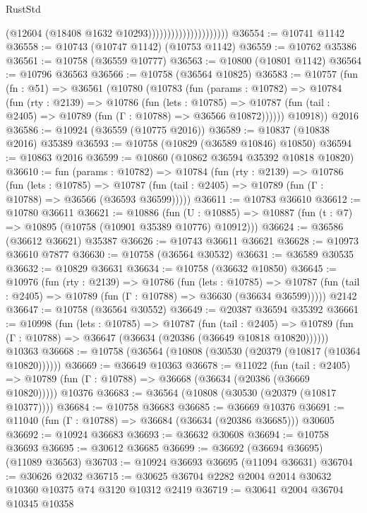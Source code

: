 \begin{lexlean}{RustStd}
\begin{coremodule}
                                          (@12604 (@18408 @1632 @10293)))))))))))))))))))))
@36554 := @10741 @1142
@36558 := @10743 (@10747 @1142) (@10753 @1142)
@36559 := @10762 @35386
@36561 := @10758 (@36559 @10777)
@36563 := @10800 (@10801 @1142)
@36564 := @10796 @36563
@36566 := @10758 (@36564 @10825)
@36583 := @10757
    (fun (fn : @51) =>
    @36561
      (@10780
        (@10783
          (fun (params : @10782) =>
          @10784
            (fun (rty : @2139) =>
            @10786
              (fun (lets : @10785) =>
              @10787 (fun (tail : @2405) => @10789 (fun (Γ : @10788) => @36566 @10872))))))
        @10918))
    @2016
@36586 := @10924 (@36559 (@10775 @2016))
@36589 := @10837 (@10838 @2016) @35389
@36593 := @10758 (@10829 (@36589 @10846) @10850)
@36594 := @10863 @2016
@36599 := @10860 (@10862 @36594 @35392 @10818 @10820)
@36610 := fun (params : @10782) =>
  @10784
    (fun (rty : @2139) =>
    @10786
      (fun (lets : @10785) =>
      @10787 (fun (tail : @2405) => @10789 (fun (Γ : @10788) => @36566 (@36593 @36599)))))
@36611 := @10783 @36610
@36612 := @10780 @36611
@36621 := @10886
    (fun (U : @10885) => @10887 (fun (t : @7) => @10895 (@10758 (@10901 @35389 @10776) @10912)))
@36624 := @36586 (@36612 @36621) @35387
@36626 := @10743 @36611 @36621
@36628 := @10973 @36610 @7877
@36630 := @10758 (@36564 @30532)
@36631 := @36589 @30535
@36632 := @10829 @36631
@36634 := @10758 (@36632 @10850)
@36645 := @10976
    (fun (rty : @2139) =>
    @10786
      (fun (lets : @10785) =>
      @10787 (fun (tail : @2405) => @10789 (fun (Γ : @10788) => @36630 (@36634 @36599)))))
    @2142
@36647 := @10758 (@36564 @30552)
@36649 := @20387 @36594 @35392
@36661 := @10998
    (fun (lets : @10785) =>
    @10787
      (fun (tail : @2405) =>
      @10789 (fun (Γ : @10788) => @36647 (@36634 (@20386 (@36649 @10818 @10820))))))
    @10363
@36668 := @10758 (@36564 (@10808 (@30530 (@20379 (@10817 (@10364 @10820))))))
@36669 := @36649 @10363
@36678 := @11022
    (fun (tail : @2405) => @10789 (fun (Γ : @10788) => @36668 (@36634 (@20386 (@36669 @10820)))))
    @10376
@36683 := @36564 (@10808 (@30530 (@20379 (@10817 @10377))))
@36684 := @10758 @36683
@36685 := @36669 @10376
@36691 := @11040 (fun (Γ : @10788) => @36684 (@36634 (@20386 @36685))) @30605
@36692 := @10924 @36683
@36693 := @36632 @30608
@36694 := @10758 @36693
@36695 := @30612 @36685
@36699 := @36692 (@36694 @36695) (@11089 @36563)
@36703 := @10924 @36693 @36695 (@11094 @36631)
@36704 := @30626 @2032
@36715 := @30625 @36704 @2282 @2004 @2014 @30632 @10360 @10375 @74 @3120 @10312 @2419
@36719 := @30641 @2004 @36704 @10345 @10358

\end{coremodule}
\end{lexlean}
